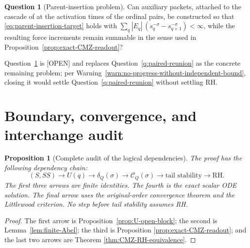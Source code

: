 \documentclass[11pt]{amsart}
\numberwithin{equation}{section}
\theoremstyle{plain}
\newtheorem{proposition}[theorem]{Proposition}
\theoremstyle{definition}
\newtheorem{question}[theorem]{Question}
\theoremstyle{remark}
\newcommand{\RH}{\mathrm{RH}}
\begin{document}
\begin{question}[Parent-insertion problem]
\label{q:parent-insertion}
Can auxiliary packets, attached to the cascade of
\cite{AlpogeBuckmasterCoiculescu2026} at the activation times of the ordinal
pairs, be constructed so that \eqref{eq:parent-insertion-target} holds with
$\sum_q|E_q|\,(s_q^{-\sigma}-s_{q+1}^{-\sigma})<\infty$, while the resulting
force increments remain summable in the sense used in
Proposition~\ref{prop:exact-CMZ-readout}?
\end{question}

Question~\ref{q:parent-insertion} is \textup{[OPEN]} and replaces
Question~\ref{q:paired-reunion} as the concrete remaining problem; per
Warning~\ref{warn:no-progress-without-independent-bound}, closing it would
settle Question~\ref{q:paired-reunion} without settling RH.

\section{Boundary, convergence, and interchange audit}
\label{sec:audit}

\begin{proposition}[Complete audit of the logical dependencies]
\label{prop:dependency-audit}
The proof has the following dependency chain:
\begin{equation}
(S,SS)\longrightarrow U(q)
\longrightarrow\delta_Q(\sigma)
\longrightarrow\mathscr C_Q(\sigma)
\longrightarrow\text{tail stability}
\longrightarrow\RH.
\label{eq:dependency-chain}
\end{equation}
The first three arrows are finite identities.  The fourth is the exact scalar
ODE solution.  The final arrow uses the original-order convergence theorem
and the Littlewood criterion.  No step before tail stability assumes RH.
\end{proposition}

\begin{proof}
The first arrow is Proposition~\ref{prop:U-open-block}; the second is
Lemma~\ref{lem:finite-Abel}; the third is Proposition
\ref{prop:exact-CMZ-readout}; and the last two arrows are Theorem
\ref{thm:CMZ-RH-equivalence}.
\end{proof}
\end{document}
